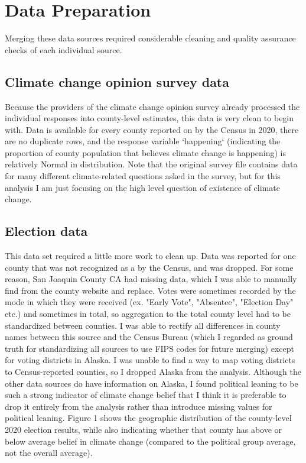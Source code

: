\documentclass{article}
\begin{document}
\section{Data Preparation}

Merging these data sources required considerable cleaning and quality
assurance checks of each individual source.

\subsection{Climate change opinion survey data}
Because the providers of the climate change opinion survey already processed
the individual responses into county-level estimates, this data is very clean
to begin with. Data is available for every county reported on by the Census
in 2020, there are no duplicate rows, and the response variable `happening`
(indicating the proportion of county population that believes climate change
is happening) is relatively Normal in distribution. Note that the original
survey file contains data for many different climate-related questions asked
in the survey, but for this analysis I am just focusing on the high level
question of existence of climate change.

\subsection{Election data}
This data set required a little more work to clean up. Data was reported for
one county that was not recognized as a by the Census, and was dropped. For
some reason, San Joaquin County CA had missing data, which I was able to 
manually find from the county website and replace. Votes were sometimes
recorded by the mode in which they were received (ex. "Early Vote", 
"Absentee", "Election Day" etc.) and sometimes in total, so aggregation to 
the total county level had to be standardized between counties. I was able
to rectify all differences in county names between this source and the 
Census Bureau (which I regarded as ground truth for standardizing all sources
to use FIPS codes for future merging) except for voting districts in Alaska.
I was unable to find a way to map voting districts to Census-reported
counties, so I dropped Alaska from the analysis. Although the other data
sources do have information on Alaska, I found political leaning to be such a
strong indicator of climate change belief that I think it is preferable to
drop it entirely from the analysis rather than introduce missing values for
political leaning.
Figure 1 shows the geographic distribution of the county-level 2020 election
results, while also indicating whether that county has above or below average
belief in climate change (compared to the political group average, not the
overall average).
\end{document}
